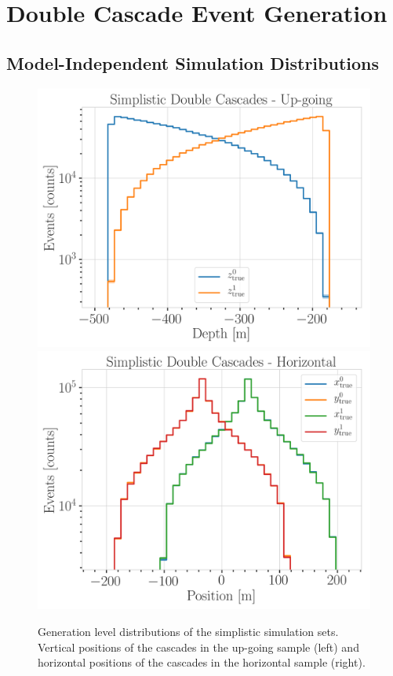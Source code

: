 
\chapter{Double Cascade Event Generation}


\section{Model-Independent Simulation Distributions} 

\begin{figure}[h]
    \centering
    \includegraphics[width=0.49\linewidth]{figures/model_independent_simulation/gen_level/up_going_simplistic_1_d_distr_depth.png}
    \includegraphics[width=0.49\linewidth]{figures/model_independent_simulation/gen_level/horizontal_simplistic_1_d_distr_position.png}
    \caption[Simplified model independent simulation generation level distributions]{Generation level distributions of the simplistic simulation sets. Vertical positions of the cascades in the up-going sample (left) and horizontal positions of the cascades in the horizontal sample (right).}
\end{figure}

